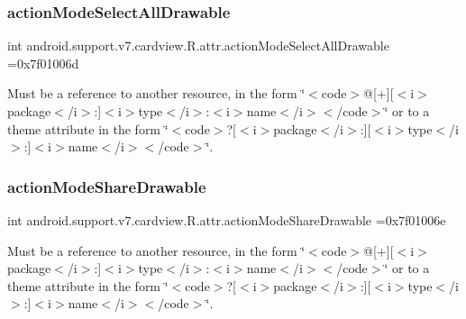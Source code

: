 \subsubsection{\texorpdfstring{action\+Mode\+Select\+All\+Drawable}{actionModeSelectAllDrawable}}
{\footnotesize\ttfamily int android.\+support.\+v7.\+cardview.\+R.\+attr.\+action\+Mode\+Select\+All\+Drawable =0x7f01006d\hspace{0.3cm}{\ttfamily [static]}}

Must be a reference to another resource, in the form \char`\"{}$<$code$>$@\mbox{[}+\mbox{]}\mbox{[}$<$i$>$package$<$/i$>$\+:\mbox{]}$<$i$>$type$<$/i$>$\+:$<$i$>$name$<$/i$>$$<$/code$>$\char`\"{} or to a theme attribute in the form \char`\"{}$<$code$>$?\mbox{[}$<$i$>$package$<$/i$>$\+:\mbox{]}\mbox{[}$<$i$>$type$<$/i$>$\+:\mbox{]}$<$i$>$name$<$/i$>$$<$/code$>$\char`\"{}. \mbox{\label{classandroid_1_1support_1_1v7_1_1cardview_1_1R_1_1attr_aa3b0c2c648267047d5c788a1203d3e2f}} 
\subsubsection{\texorpdfstring{action\+Mode\+Share\+Drawable}{actionModeShareDrawable}}
{\footnotesize\ttfamily int android.\+support.\+v7.\+cardview.\+R.\+attr.\+action\+Mode\+Share\+Drawable =0x7f01006e\hspace{0.3cm}{\ttfamily [static]}}

Must be a reference to another resource, in the form \char`\"{}$<$code$>$@\mbox{[}+\mbox{]}\mbox{[}$<$i$>$package$<$/i$>$\+:\mbox{]}$<$i$>$type$<$/i$>$\+:$<$i$>$name$<$/i$>$$<$/code$>$\char`\"{} or to a theme attribute in the form \char`\"{}$<$code$>$?\mbox{[}$<$i$>$package$<$/i$>$\+:\mbox{]}\mbox{[}$<$i$>$type$<$/i$>$\+:\mbox{]}$<$i$>$name$<$/i$>$$<$/code$>$\char`\"{}. \mbox{\label{classandroid_1_1support_1_1v7_1_1cardview_1_1R_1_1attr_aa4274d8662f21f4ce9f787ee5bfd927a}} 

